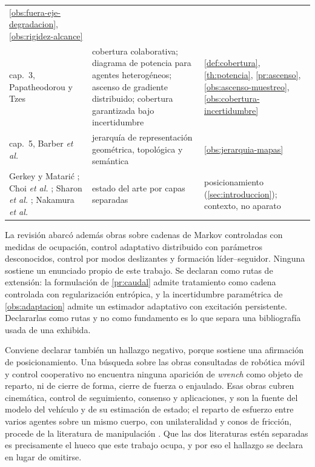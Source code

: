 \begin{table}[!ht]
\begin{tabularx}{\textwidth}{@{}p{4.6cm}p{3.5cm}X@{}}
    \cref{obs:fuera-eje-degradacion}, \cref{obs:rigidez-alcance} \\
\quad cap.~3, Papatheodorou y Tzes
  & cobertura colaborativa; diagrama de potencia para agentes heterogéneos;
    ascenso de gradiente distribuido; cobertura garantizada bajo
    incertidumbre
  & \cref{def:cobertura}, \cref{th:potencia}, \cref{pr:ascenso},
    \cref{obs:ascenso-muestreo}, \cref{obs:cobertura-incertidumbre} \\
\quad cap.~5, Barber \emph{et al.}
  & jerarquía de representación geométrica, topológica y semántica
  & \cref{obs:jerarquia-mapas} \\
Gerkey y Matarić \cite{gerkey2004taxonomy};
Choi \emph{et al.} \cite{choi2009cbba};
Sharon \emph{et al.} \cite{sharon2015cbs};
Nakamura \emph{et al.} \cite{nakamura1989dynamics}
  & estado del arte por capas separadas
  & posicionamiento (\cref{sec:introduccion}); contexto, no aparato \\
\bottomrule
\end{tabularx}
\end{table}

\begin{observacion}
\label{obs:no-usadas}
La revisión abarcó además obras sobre cadenas de Markov controladas con medidas
de ocupación, control adaptativo distribuido con parámetros desconocidos, control
por modos deslizantes y formación líder--seguidor. Ninguna sostiene un enunciado
propio de este trabajo. Se declaran como rutas de extensión: la formulación de
\cref{pr:caudal} admite tratamiento como cadena controlada con regularización
entrópica, y la incertidumbre paramétrica de \cref{obs:adaptacion} admite un
estimador adaptativo con excitación persistente. Declararlas como rutas y no como
fundamento es lo que separa una bibliografía usada de una exhibida.
\end{observacion}

\begin{observacion}
\label{obs:biblioteca-fisica}
Conviene declarar también un hallazgo negativo, porque sostiene una afirmación
de posicionamiento. Una búsqueda sobre las obras consultadas de robótica móvil y
control cooperativo no encuentra ninguna aparición de \emph{wrench} como objeto
de reparto, ni de cierre de forma, cierre de fuerza o enjaulado. Esas obras
cubren cinemática, control de seguimiento, consenso y aplicaciones, y son la
fuente del modelo del vehículo y de su estimación de estado; el reparto de
esfuerzo entre varios agentes sobre un mismo cuerpo, con unilateralidad y conos
de fricción, procede de la literatura de manipulación
\cite{rimon1996caging,bicchi1995closure,stewart2000rigid,nakamura1989dynamics}.
Que las dos literaturas estén separadas es precisamente el hueco que este
trabajo ocupa, y por eso el hallazgo se declara en lugar de omitirse.
\end{observacion}
